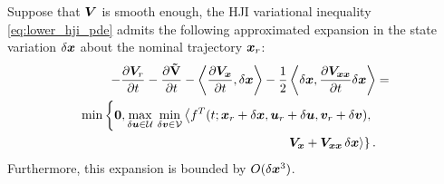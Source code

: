 %
\begin{theorem}
	Suppose that $\bm{V}$ is smooth enough, the HJI variational inequality \cf \eqref{eq:lower_hji_pde} admits the following approximated expansion in the state variation $\delta \bm{x}$ about the nominal trajectory $\bm{x}_r$:
	\begin{align}
		\begin{split} 
			-\frac{\partial \valuefunc_r}{\partial t} -\frac{\partial \costdiff}{\partial t} - \left\langle \dfrac{\partial\valuefunc_{\state}}{\partial t}, \delta\state \right \rangle -  \dfrac{1}{2} \left\langle \delta \state, \dfrac{\partial \valuefunc_{\state\state} }{\partial t}\delta\state \right \rangle &=  \\
			\min \left\{\bm{0},  
			\max_{\delta \control \in \mathcal{U}} \, \min_{\delta \disturb \in \mathcal{V}} \left\langle f^T(t; \state_r + \delta \state, \control_r + \delta \control,  \disturb_r + \delta \disturb), \right. \right. \\
			\left. \left. \valuefunc_{\state} +  \valuefunc_{\state\state}\, \delta \state \right\rangle \right\}. 
		\end{split}
		\label{eq:ROM_HJI}
	\end{align}
	Furthermore, this expansion is bounded by $O(\delta \bm{x}^3)$.
	\label{th:quad_approx}
\end{theorem}
%
